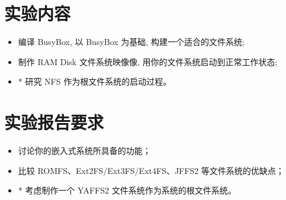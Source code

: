 \section{实验内容}
\begin{itemize}
    \item 编译 BusyBox, 以 BusyBox 为基础, 构建一个适合的文件系统;
    \item 制作 RAM Disk 文件系统映像像, 用你的文件系统启动到正常工作状态;
    \item * 研究 NFS 作为根文件系统的启动过程。
\end{itemize}

\section{实验报告要求}
\begin{itemize}
    \item 讨论你的嵌入式系统所具备的功能；
    \item 比较 ROMFS、Ext2FS/Ext3FS/Ext4FS、JFFS2 等文件系统的优缺点；
    \item * 考虑制作一个 YAFFS2 文件系统作为系统的根文件系统。
\end{itemize}
